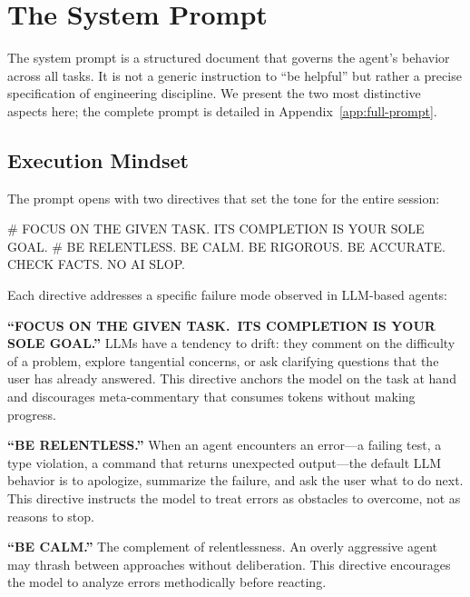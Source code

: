 \documentclass{article}
\begin{document}
\section{The System Prompt}
\label{sec:system-prompt}

The system prompt is a structured document that governs the agent's behavior across all tasks.  It is not a generic instruction to ``be helpful'' but rather a precise specification of engineering discipline.  We present the two most distinctive aspects here; the complete prompt is detailed in Appendix~\ref{app:full-prompt}.

\subsection{Execution Mindset}
\label{sec:execution-mindset}

The prompt opens with two directives that set the tone for the entire session:

\begin{prompt}
# FOCUS ON THE GIVEN TASK. ITS COMPLETION IS YOUR SOLE GOAL.
# BE RELENTLESS. BE CALM. BE RIGOROUS. BE ACCURATE. CHECK FACTS. NO AI SLOP.
\end{prompt}

\noindent Each directive addresses a specific failure mode observed in LLM-based agents:

\textbf{``FOCUS ON THE GIVEN TASK.\ ITS COMPLETION IS YOUR SOLE GOAL.''}  LLMs have a tendency to drift: they comment on the difficulty of a problem, explore tangential concerns, or ask clarifying questions that the user has already answered.  This directive anchors the model on the task at hand and discourages meta-commentary that consumes tokens without making progress.

\textbf{``BE RELENTLESS.''}  When an agent encounters an error---a failing test, a type violation, a command that returns unexpected output---the default LLM behavior is to apologize, summarize the failure, and ask the user what to do next.  This directive instructs the model to treat errors as obstacles to overcome, not as reasons to stop.

\textbf{``BE CALM.''}  The complement of relentlessness.  An overly aggressive agent may thrash between approaches without deliberation.  This directive encourages the model to analyze errors methodically before reacting.
\end{document}
